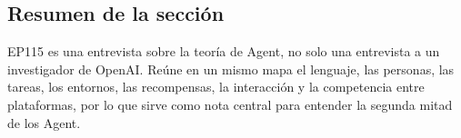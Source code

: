 \subsection{Resumen de la sección}

EP115 es una entrevista sobre la teoría de Agent, no solo una entrevista a un investigador de OpenAI. Reúne en un mismo mapa el lenguaje, las personas, las tareas, los entornos, las recompensas, la interacción y la competencia entre plataformas, por lo que sirve como nota central para entender la segunda mitad de los Agent.
